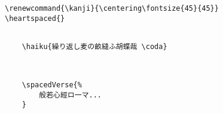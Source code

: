 \documentclass[letterpaper]{article}
\begin{document}
	\vspace*{2cm}
	\renewcommand{\kanji}{\centering\fontsize{40}{40}}
	
	\textcolor{gray}{\kanji{四弘誓願}}
	\vspace*{2cm}
	
	\begin{multicols}{4}
		
		\renewcommand{\kanji}{\centering\fontsize{45}{45}}
		\RLmulticolcolumns
		
\end{multicols}

\begin{verbatim}
\renewcommand{\kanji}{\centering\fontsize{45}{45}}
\heartspaced{}
\end{verbatim}

\pagebreak

\vspace*{2cm}

\begin{multicols}{4}
	\RLmulticolcolumns
	\renewcommand{\kanji}{\centering\fontsize{35}{35}}
\end{multicols}

\begin{verbatim}
 
    \haiku{繰り返し麦の畝縫ふ胡蝶哉 \coda}
    
\end{verbatim}


\pagebreak

\vspace*{1cm}
\renewcommand{\kanji}{\centering\fontsize{25}{25}}
\begin{multicols}{7}
	\RLmulticolcolumns
\end{multicols}

\begin{verbatim}

	\spacedVerse{%
		般若心經ロ一マ...
	}

\end{verbatim}
\end{document}
